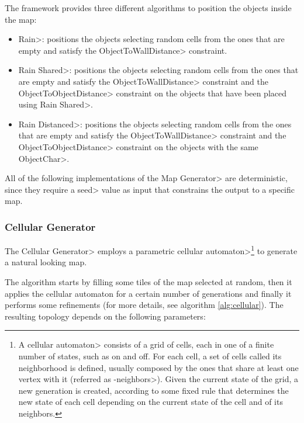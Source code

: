 The framework provides three different algorithms to position the objects inside the map:

\begin{itemize}
\item \<Rain>: positions the objects selecting random cells from the ones that are empty and satisfy the \<ObjectToWallDistance> constraint.
\item \<Rain Shared>: positions the objects selecting random cells from the ones that are empty and satisfy the \<ObjectToWallDistance> constraint and the \<ObjectToObjectDistance> constraint on the objects that have been placed using \<Rain Shared>.
\item \<Rain Distanced>: positions the objects selecting random cells from the ones that are empty and satisfy the \<ObjectToWallDistance> constraint and the \<ObjectToObjectDistance> constraint on the objects with the same \<ObjectChar>.
\end{itemize}

All of the following implementations of the \<Map Generator> are deterministic, since they require a \<seed> value as input that constrains the output to a specific map.


\subsubsection{Cellular Generator}

The \<Cellular Generator> employs a parametric \<cellular automaton>\footnote{A \<cellular automaton> consists of a grid of cells, each in one of a finite number of states, such as on and off. For each cell, a set of cells called its neighborhood is defined, usually composed by the ones that share at least one vertex with it (referred as -neighbors>). Given the current state of the grid, a new generation is created, according to some fixed rule that determines the new state of each cell depending on the current state of the cell and of its neighbors.} to generate a natural looking map. 

\par

The algorithm starts by filling some tiles of the map selected at random, then it applies the cellular automaton for a certain number of generations and finally it performs some refinements (for more details, see algorithm \ref{alg:cellular}). The resulting topology depends on the following parameters:

